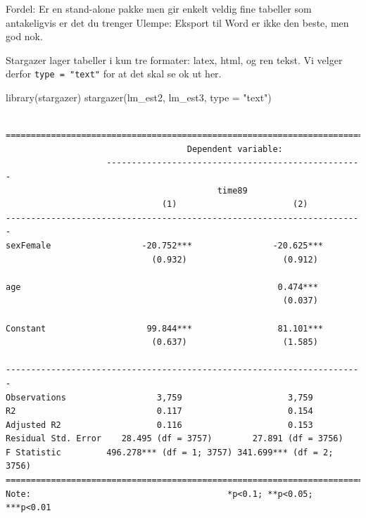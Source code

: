 \documentclass[
  letterpaper,
  DIV=11,
  numbers=noendperiod]{scrreprt}
\newenvironment{Shaded}{\begin{snugshade}}{\end{snugshade}}
\newcommand{\AttributeTok}[1]{\textcolor[rgb]{0.40,0.45,0.13}{#1}}
\newcommand{\FunctionTok}[1]{\textcolor[rgb]{0.28,0.35,0.67}{#1}}
\newcommand{\NormalTok}[1]{\textcolor[rgb]{0.00,0.23,0.31}{#1}}
\newcommand{\StringTok}[1]{\textcolor[rgb]{0.13,0.47,0.30}{#1}}
\theoremstyle{definition}
\theoremstyle{remark}
\begin{document}
Fordel: Er en stand-alone pakke men gir enkelt veldig fine tabeller som
antakeligvis er det du trenger Ulempe: Eksport til Word er ikke den
beste, men god nok.

Stargazer lager tabeller i kun tre formater: latex, html, og ren tekst.
Vi velger derfor \texttt{type\ =\ "text"} for at det skal se ok ut her.

\begin{Shaded}
\begin{Highlighting}[]
\FunctionTok{library}\NormalTok{(stargazer)}
\FunctionTok{stargazer}\NormalTok{(lm\_est2, lm\_est3, }\AttributeTok{type =} \StringTok{"text"}\NormalTok{)}
\end{Highlighting}
\end{Shaded}

\begin{verbatim}

=======================================================================
                                    Dependent variable:                
                    ---------------------------------------------------
                                          time89                       
                               (1)                       (2)           
-----------------------------------------------------------------------
sexFemale                  -20.752***                -20.625***        
                             (0.932)                   (0.912)         
                                                                       
age                                                   0.474***         
                                                       (0.037)         
                                                                       
Constant                    99.844***                 81.101***        
                             (0.637)                   (1.585)         
                                                                       
-----------------------------------------------------------------------
Observations                  3,759                     3,759          
R2                            0.117                     0.154          
Adjusted R2                   0.116                     0.153          
Residual Std. Error    28.495 (df = 3757)        27.891 (df = 3756)    
F Statistic         496.278*** (df = 1; 3757) 341.699*** (df = 2; 3756)
=======================================================================
Note:                                       *p<0.1; **p<0.05; ***p<0.01
\end{verbatim}
\end{document}
